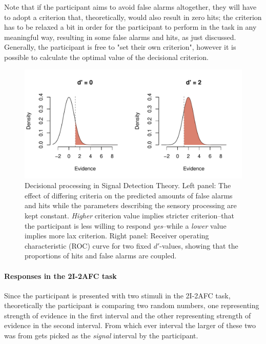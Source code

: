 \documentclass{article}\usepackage{knitr}
\begin{document}
Note that if the participant aims to avoid false alarms altogether, they will have to adopt a criterion that, theoretically, would also result in zero hits; the criterion has to be relaxed a bit in order for the participant to perform in the task in any meaningful way, resulting in some false alarms and hits, as just discussed. Generally, the participant is free to "set their own criterion", however it is possible to calculate the optimal value of the decisional criterion. 

\begin{figure}[!htb]
\begin{center}
\begin{knitrout}
\color{fgcolor}
\includegraphics[width=\maxwidth]{figure/unnamed-chunk-5-1} 

\end{knitrout}
\end{center}
\caption{ Decisional processing in Signal Detection Theory. Left panel: The effect of differing criteria on the predicted amounts of false alarms and hits while the parameters describing the sensory processing are kept constant. \textit{Higher} criterion value implies stricter criterion--that the participant is less willing to respond \textit{yes}--while a \textit{lower} value implies more lax criterion. Right panel: Receiver operating characteristic (ROC) curve for two fixed $d'$-values, showing that the proportions of hits and false alarms are coupled.}
\label{fig:critchange}
\end{figure}

\paragraph{Responses in the 2I-2AFC task}

Since the participant is presented with two stimuli in the 2I-2AFC task, theoretically the participant is comparing two random numbers, one representing strength  of evidence in the first interval and the other representing strength of evidence in the second interval. From which ever interval the larger of these two was from gets picked as the \textit{signal} interval by the participant.
\end{document}
